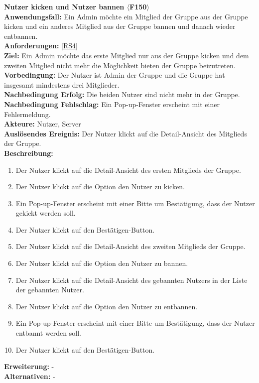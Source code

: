 \documentclass[parskip=full]{scrartcl}
\begin{document}
\textbf{Nutzer kicken und Nutzer bannen $\langle$F150$\rangle$}\\
\textbf{Anwendungsfall:} Ein Admin möchte ein Mitglied der Gruppe aus der Gruppe kicken und ein anderes Mitglied aus der Gruppe bannen und danach wieder entbannen.\\
\textbf{Anforderungen:} \ref{RS4}\\
\textbf{Ziel:} Ein Admin möchte das erste Mitglied nur aus der Gruppe kicken und dem zweiten Mitglied nicht mehr die Möglichkeit bieten der Gruppe beizutreten.\\
\textbf{Vorbedingung:} Der Nutzer ist Admin der Gruppe und die Gruppe hat insgesamt mindestens drei Mitglieder.\\
\textbf{Nachbedingung Erfolg:} Die beiden Nutzer sind nicht mehr in der Gruppe.\\
\textbf{Nachbedingung Fehlschlag:} Ein Pop-up-Fenster erscheint mit einer Fehlermeldung.\\
\textbf{Akteure:} Nutzer, Server \\
\textbf{Auslösendes Ereignis:} Der Nutzer klickt auf die Detail-Ansicht des Mitglieds der Gruppe.\\
\textbf{Beschreibung:}
\begin{enumerate}
    \item Der Nutzer klickt auf die Detail-Ansicht des ersten Mitglieds der Gruppe.
    \item Der Nutzer klickt auf die Option den Nutzer zu kicken.
    \item Ein Pop-up-Fenster erscheint mit einer Bitte um Bestätigung, dass der Nutzer gekickt werden soll.
    \item Der Nutzer klickt auf den Bestätigen-Button.
    \item Der Nutzer klickt auf die Detail-Ansicht des zweiten Mitglieds der Gruppe.
    \item Der Nutzer klickt auf die Option den Nutzer zu bannen.
    \item Der Nutzer klickt auf die Detail-Ansicht des gebannten Nutzers in der Liste der gebannten Nutzer.
    \item Der Nutzer klickt auf die Option den Nutzer zu entbannen.
    \item Ein Pop-up-Fenster erscheint mit einer Bitte um Bestätigung, dass der Nutzer entbannt werden soll.
    \item Der Nutzer klickt auf den Bestätigen-Button.
\end{enumerate}
\textbf{Erweiterung:} -\\
\textbf{Alternativen:} -\\
\newpage
\end{document}
